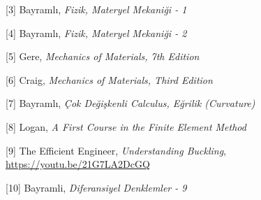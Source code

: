 \documentclass[12pt,fleqn]{article}\usepackage{../../common}
\begin{document}
[3] Bayramlı, {\em Fizik, Materyel Mekaniği - 1}
    
[4] Bayramlı, {\em Fizik, Materyel Mekaniği - 2}

[5] Gere, {\em Mechanics of Materials, 7th Edition}

[6] Craig, {\em Mechanics of Materials, Third Edition}

[7] Bayramlı, {\em Çok Değişkenli Calculus, Eğrilik (Curvature)}

[8] Logan, {\em A First Course in the Finite Element Method}

[9] The Efficient Engineer, {\em Understanding Buckling},
    \url{https://youtu.be/21G7LA2DcGQ}

[10] Bayramli, {\em Diferansiyel Denklemler - 9}
    
\end{document}
